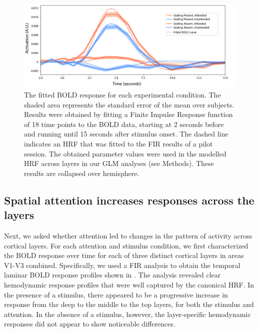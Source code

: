 \documentclass[9pt,lineno]{aperture}
\begin{document}
\begin{figure}
\includegraphics[width=\linewidth]{img/fir.png}
\caption{ The fitted BOLD response for each experimental condition. The shaded area represents the standard error of the mean over subjects. Results were obtained by fitting a Finite Impulse Response function of 18 time points to the BOLD data, starting at 2 seconds before and running until 15 seconds after stimulus onset. The dashed line indicates an HRF that was fitted to the FIR results of a pilot session. The obtained parameter values were used in the modelled HRF across layers in our GLM analyses (see Methods). These results are collapsed over hemisphere.}
\label{fig:fir_global}
\label{figsupp:fir_both_hemis}
\end{figure}

\subsection{Spatial attention increases responses across the layers}
Next, we asked whether attention led to changes in the pattern of activity across cortical layers. For each attention and stimulus condition, we first characterized the BOLD response over time for each of three distinct cortical layers in areas V1-V3 combined. Specifically, we used a FIR analysis to obtain the temporal laminar BOLD response profiles shown in . The analysis revealed clear hemodynamic response profiles that were well captured by the canonical HRF. In the presence of a stimulus, there appeared to be a progressive increase in response from the deep to the middle to the top layers, for both the stimulus and attention. In the absence of a stimulus, however, the layer-specific hemodynamic responses did not appear to show noticeable differences.
\end{document}
